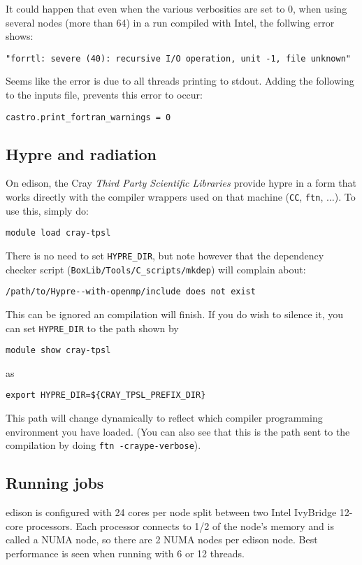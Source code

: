 It could happen that even when the various verbosities are set to 0, when using several nodes (more than 64) in a run compiled with Intel, the follwing error shows:
\begin{verbatim}
"forrtl: severe (40): recursive I/O operation, unit -1, file unknown"
\end{verbatim}

Seems like the error is due to all threads printing to stdout. Adding the following to the inputs file, prevents this error to occur:
\begin{verbatim}
castro.print_fortran_warnings = 0
\end{verbatim}


\subsection{Hypre and radiation}

On edison, the Cray {\em Third Party Scientific Libraries} provide
{\sf hypre} in a form that works directly with the compiler wrappers
used on that machine ({\tt CC}, {\tt ftn}, $\ldots$).  To use this,
simply do:
\begin{verbatim}
module load cray-tpsl
\end{verbatim}
There is no need to set {\tt HYPRE\_DIR}, but note however that the 
dependency checker script ({\tt BoxLib/Tools/C\_scripts/mkdep}) will
complain about:
\begin{verbatim}
/path/to/Hypre--with-openmp/include does not exist
\end{verbatim}
This can be ignored an compilation will finish.  If you do wish to 
silence it, you can set {\tt HYPRE\_DIR} to the path shown by
\begin{verbatim}
module show cray-tpsl
\end{verbatim}
as
\begin{verbatim}
export HYPRE_DIR=${CRAY_TPSL_PREFIX_DIR}
\end{verbatim}
This path will change dynamically to reflect which compiler programming
environment you have loaded.  (You can also see that this is the path
sent to the compilation by doing {\tt ftn -craype-verbose}).


\subsection{Running jobs}

edison is configured with 24 cores per node split between two Intel             
IvyBridge 12-core processors.  Each processor connects to 1/2 of the            
node's memory and is called a NUMA node, so there are 2 NUMA nodes per          
edison node.  Best performance is seen when running with 6 or 12 threads.  

